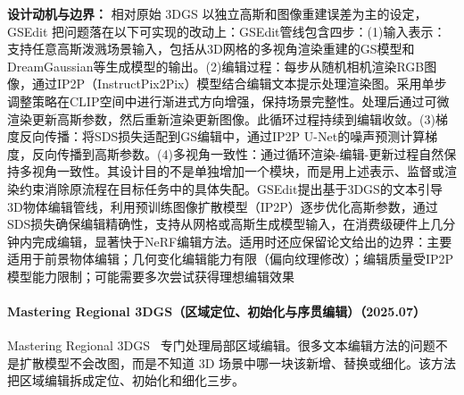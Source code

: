 \textbf{设计动机与边界：} 相对原始 3DGS 以独立高斯和图像重建误差为主的设定，GSEdit 把问题落在以下可实现的改动上：GSEdit管线包含四步：(1)输入表示：支持任意高斯泼溅场景输入，包括从3D网格的多视角渲染重建的GS模型和DreamGaussian等生成模型的输出。(2)编辑过程：每步从随机相机渲染RGB图像，通过IP2P（InstructPix2Pix）模型结合编辑文本提示处理渲染图。采用单步调整策略在CLIP空间中进行渐进式方向增强，保持场景完整性。处理后通过可微渲染更新高斯参数，然后重新渲染更新图像。此循环过程持续到编辑收敛。(3)梯度反向传播：将SDS损失适配到GS编辑中，通过IP2P U-Net的噪声预测计算梯度，反向传播到高斯参数。(4)多视角一致性：通过循环渲染-编辑-更新过程自然保持多视角一致性。其设计目的不是单独增加一个模块，而是用上述表示、监督或渲染约束消除原流程在目标任务中的具体失配。GSEdit提出基于3DGS的文本引导3D物体编辑管线，利用预训练图像扩散模型（IP2P）逐步优化高斯参数，通过SDS损失确保编辑精确性，支持从网格或高斯生成模型输入，在消费级硬件上几分钟内完成编辑，显著快于NeRF编辑方法。适用时还应保留论文给出的边界：主要适用于前景物体编辑；几何变化编辑能力有限（偏向纹理修改）；编辑质量受IP2P模型能力限制；可能需要多次尝试获得理想编辑效果
\paragraph{Mastering Regional 3DGS（区域定位、初始化与序贯编辑）（2025.07）}
Mastering Regional 3DGS~\cite{2507_05426} 专门处理局部区域编辑。很多文本编辑方法的问题不是扩散模型不会改图，而是不知道 3D 场景中哪一块该新增、替换或细化。该方法把区域编辑拆成定位、初始化和细化三步。

